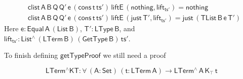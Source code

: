 \documentclass[9pt]{entcs}
\begin{document}
\begin{align*}
  &\mathsf{clist\, A\, B\, Q\, Q'\, e\, (cons\, t\, ts') \, liftE\,
    (nothing , lift_{ts'}) = nothing} \\ 
  &\mathsf{clist\, A\, B\, Q\, Q'\, e\, (cons\, t\, ts') \, liftE\,
    (just\, T' , lift_{ts'}) = just \, (TList\, B\, e\, T')} 
\end{align*}
Here $\mathsf{e : Equal\, A\, (List\,B)}$, $\mathsf{T' : LType\, B}$,
and $\mathsf{lift_{ts'} : List^{\wedge}\, (LTerm\, B)\, (GetType\,
  B)\, ts'}$.

\pagebreak

To finish defining $\mathsf{getTypeProof}$ we still need a proof

\vspace*{-0.1in}

\[ \mathsf{LTerm^\wedge KT : \forall\, (A : Set)\, (t : LTerm\, A) \to
  LTerm^{\wedge}\, A\, K_\top\,t} \]

\vspace*{-0.05in}
\end{document}
